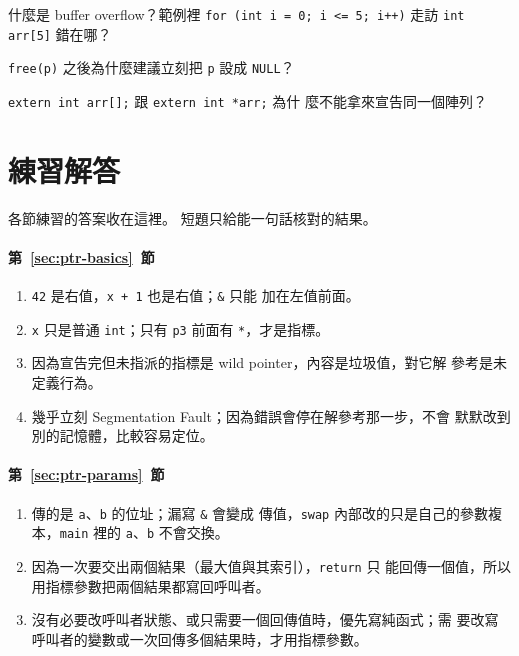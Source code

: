 
\begin{drills}[label=drills:ptr-pitfalls]
\item 什麼是 buffer overflow？範例裡 \texttt{for (int i = 0; i <= 5;
i++)} 走訪 \texttt{int arr[5]} 錯在哪？
\item \texttt{free(p)} 之後為什麼建議立刻把 \texttt{p} 設成
\texttt{NULL}？
\item \texttt{extern int arr[];} 跟 \texttt{extern int *arr;} 為什
麼不能拿來宣告同一個陣列？
\end{drills}

\section*{練習解答}

各節練習的答案收在這裡。 短題只給能一句話核對的結果。

\paragraph{第~\ref{sec:ptr-basics}~節}
\begin{enumerate}
\item \texttt{42} 是右值，\texttt{x + 1} 也是右值；\texttt{\&} 只能
加在左值前面。
\item \texttt{x} 只是普通 \texttt{int}；只有 \texttt{p3} 前面有
\texttt{*}，才是指標。
\item 因為宣告完但未指派的指標是 wild pointer，內容是垃圾值，對它解
參考是未定義行為。
\item 幾乎立刻 Segmentation Fault；因為錯誤會停在解參考那一步，不會
默默改到別的記憶體，比較容易定位。
\end{enumerate}

\paragraph{第~\ref{sec:ptr-params}~節}
\begin{enumerate}
\item 傳的是 \texttt{a}、\texttt{b} 的位址；漏寫 \texttt{\&} 會變成
傳值，\texttt{swap} 內部改的只是自己的參數複本，\texttt{main} 裡的
\texttt{a}、\texttt{b} 不會交換。
\item 因為一次要交出兩個結果（最大值與其索引），\texttt{return} 只
能回傳一個值，所以用指標參數把兩個結果都寫回呼叫者。
\item 沒有必要改呼叫者狀態、或只需要一個回傳值時，優先寫純函式；需
要改寫呼叫者的變數或一次回傳多個結果時，才用指標參數。
\end{enumerate}

